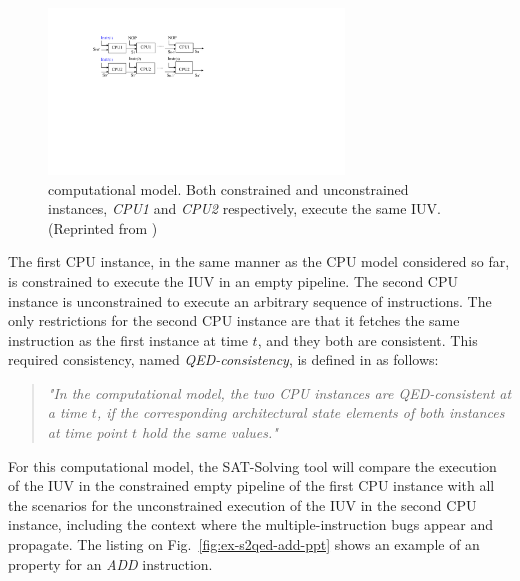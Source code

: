 \begin{figure}[htb!]
	\centering
	\includegraphics[width=0.7\textwidth]{images/s2qed_model.pdf}
	\caption{\SSQED{} computational model. Both constrained and unconstrained instances, \textit{CPU1} and \textit{CPU2} respectively, execute the same IUV. (Reprinted from \cite{paper-gapfree})}
	\label{fig:s2qed-model}
\end{figure}

The first CPU instance, in the same manner as the CPU model considered so far, is constrained to execute the IUV in an empty pipeline. The second CPU instance is unconstrained to execute an arbitrary sequence of instructions. The only restrictions for the second CPU instance are that it fetches the same instruction as the first instance at time $t$, and they both are consistent. This required consistency, named \textit{QED-consistency}, is defined in \cite{paper-gapfree} as follows:

\begin{quote}
     \textit{"In the \SSQED{} computational model, the two CPU instances are QED-consistent at a time $t$, if the corresponding architectural state elements of both instances at time point $t$ hold the same values."}
\end{quote}

For this \SSQED{} computational model, the SAT-Solving tool will compare the execution of the IUV in the constrained empty pipeline of the first CPU instance with all the scenarios for the unconstrained execution of the IUV in the second CPU instance, including the context where the multiple-instruction bugs appear and propagate. The listing on Fig.~\ref{fig:ex-s2qed-add-ppt} shows an example of an \SSQED{} property for an \textit{ADD} instruction.


